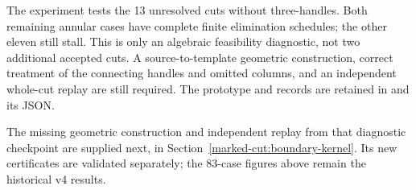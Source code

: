 The experiment tests the 13 unresolved cuts without three-handles. Both
remaining annular cases have complete finite elimination schedules; the
other eleven still stall. This is only an algebraic feasibility diagnostic,
not two additional accepted cuts. A source-to-template geometric construction,
correct treatment of the connecting handles and omitted columns, and an
independent whole-cut replay are still required. The prototype and records
are retained in  and its JSON.

The missing geometric construction and independent replay from that
diagnostic checkpoint are supplied next, in
Section~\ref{marked-cut:boundary-kernel}. Its new certificates are validated
separately; the 83-case figures above remain the historical v4 results.
